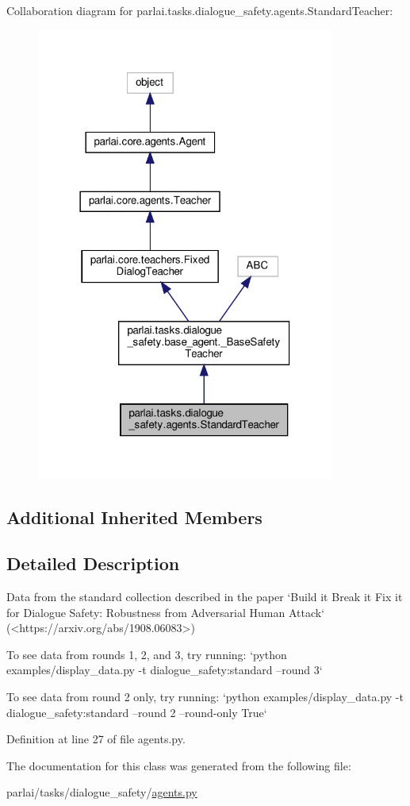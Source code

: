 Collaboration diagram for parlai.\+tasks.\+dialogue\+\_\+safety.\+agents.\+Standard\+Teacher\+:
\nopagebreak
\begin{figure}[H]
\begin{center}
\leavevmode
\includegraphics[width=278pt]{classparlai_1_1tasks_1_1dialogue__safety_1_1agents_1_1StandardTeacher__coll__graph}
\end{center}
\end{figure}
\subsection*{Additional Inherited Members}


\subsection{Detailed Description}
\begin{DoxyVerb}Data from the standard collection described in the paper
`Build it Break it Fix it for Dialogue Safety: Robustness from
Adversarial Human Attack` (<https://arxiv.org/abs/1908.06083>)

To see data from rounds 1, 2, and 3, try running:
`python examples/display_data.py -t dialogue_safety:standard --round 3`

To see data from round 2 only, try running:
`python examples/display_data.py -t dialogue_safety:standard --round 2
 --round-only True`
\end{DoxyVerb}
 

Definition at line 27 of file agents.\+py.



The documentation for this class was generated from the following file\+:\begin{DoxyCompactItemize}
\item 
parlai/tasks/dialogue\+\_\+safety/\hyperlink{parlai_2tasks_2dialogue__safety_2agents_8py}{agents.\+py}\end{DoxyCompactItemize}
